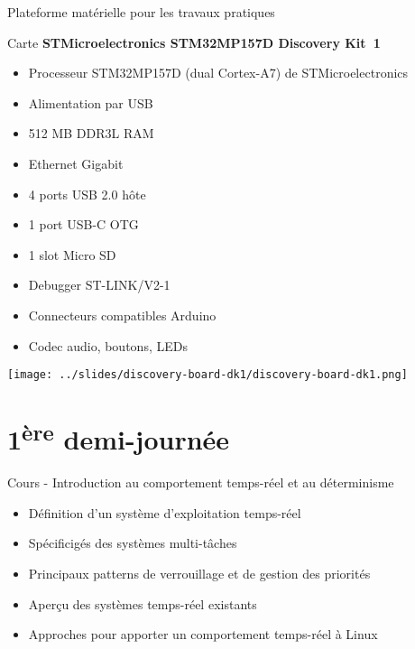 \documentclass[a4paper,12pt,obeyspaces,spaces,hyphens]{article}
\begin{document}
\feshowtitle

\feshowinfo

\feagendatwocolumn
{Plateforme matérielle pour les travaux pratiques}
{
  Carte {\bf STMicroelectronics STM32MP157D Discovery Kit~1}
  \begin{itemize}
  \item Processeur STM32MP157D (dual Cortex-A7) de STMicroelectronics
  \item Alimentation par USB
  \item 512 MB DDR3L RAM
  \item Ethernet Gigabit
  \item 4 ports USB 2.0 hôte
  \item 1 port USB-C OTG
  \item 1 slot Micro SD
  \item Debugger ST-LINK/V2-1
  \item Connecteurs compatibles Arduino
  \item Codec audio, boutons, LEDs
  \end{itemize}
}
{}
{
  \begin{center}
    \texttt{[image: ../slides/discovery-board-dk1/discovery-board-dk1.png]}
  \end{center}
}

\section{1\textsuperscript{ère} demi-journée}

\feagendaonecolumn
{Cours - Introduction au comportement temps-réel et au déterminisme}
{
  \begin{itemize}
  \item Définition d'un système d'exploitation temps-réel
  \item Spécificigés des systèmes multi-tâches
  \item Principaux patterns de verrouillage et de gestion des priorités
  \item Aperçu des systèmes temps-réel existants
  \item Approches pour apporter un comportement temps-réel à Linux
  \end{itemize}
}
\end{document}
